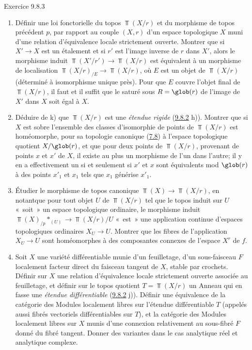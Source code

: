 \begin{enonce*}[remark]{Exercice 9.8.3}
\begin{enumerate}
\item Définir une loi fonctorielle du topos $\Top(X/r)$ et du
morphisme de topos précédent $p$, par rapport au couple $(X,r)$ d'un
espace topologique $X$ muni d'une relation d'équivalence locale
strictement ouverte. Montrer que si $X'\rightarrow X$ est un
étalement et si $r'$ est l'image inverse de $r$ dans $X'$, alors le
morphisme induit $\Top(X'/r')\rightarrow \Top(X/r)$ est équivalent à
un morphisme de localisation $\Top(X/r)_{/E}\rightarrow \Top(X/r)$,
où $E$ est un objet de $\Top(X/r)$ (déterminé à isomorphisme unique
près). Pour que $E$ couvre l'objet final de $\Top(X/r)$, il faut et
il suffit que le saturé sous $R=\glob(r)$ de l'image de $X'$ dans
$X$ soit égal à $X$.

\item Déduire de k) que $\Top(X/r)$ est une \emph{étendue rigide}
(\hyperref[IV.exer9.8.2]{9.8.2} h)). Montrer que si $X$ est sobre l'ensemble des
classes
     d'isomorphie de points de $\Top(X/r)$ est homéomorphe, pour sa
     topologie canonique (\hyperref[IV.exer7.8]{7.8}) à l'espace topologique quotient
     $X/\glob(r)$, et que pour deux points de $\Top(X/r)$, provenant
     de points $x$ et $x'$ de $X$, il existe au plus un morphisme de
     l'un dans l'autre; il y en a effectivement un si et seulement si
     $x'$ et $x$ sont équivalents mod $\glob(r)$ à des points $x'_1$
     et $x_1$ tels que $x_1$ générise $x'_1$.

\item Étudier le morphisme de topos canonique $\Top(X)\rightarrow
     \Top(X/r)$, en notant\pageoriginale que pour tout objet $U$ de
     $\Top(X/r)$ tel que le topos induit sur $U$ « soit »  un
     espace topologique ordinaire, le morphisme induit
     $\Top(X)_{/p}\ast_{(U)}\rightarrow \Top(X/r)/U$ « est »  une
     application continue d'espaces topologiques ordinaires
     $X_U\rightarrow U$. Montrer que les fibres de l'application
     $X_U\rightarrow U$ sont homéomorphes à des composantes connexes
     de l'espace $X^r$ de $f$.

\item Soit $X$ une variété différentiable munie d'un feuilletage, \ie
     d'un sous-faisceau $F$ localement facteur direct du faisceau
     tangent de $X$, stable par crochets. Définir sur $X$ une relation
     d'équivalence locale strictement ouverte associée au feuilletage,
     et définir sur le topos quotient $T=\Top(X/r)$ un Anneau qui en
     fasse une \emph{étendue différentiable} (\hyperref[IV.exer9.8.2]{9.8.2} j)). Définir une
     équivalence de la catégorie des Modules localement libres sur
     l'étendue différentiable $T$ (appelés aussi fibrés vectoriels
     différentiables sur $T$), et la catégorie des Modules localement
     libres sur $X$ munis d'une connexion relativement au sous-fibré
     $F$ donné du fibré tangent. Donner des variantes dans le cas
     analytique réel et analytique complexe.
\end{enumerate}
\end{enonce*}

